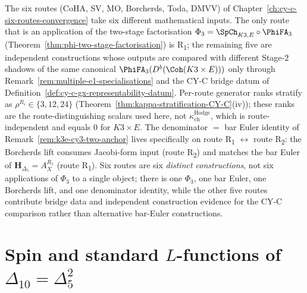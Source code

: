 \begin{remark}
\label{rem:k3e-cy3-six-routes-per-route-kappa}
The six routes (CoHA, SV, MO, Borcherds, Toda, DMVV) of Chapter~\ref{ch:cy-c-six-routes-convergence} take six different mathematical inputs. The only route that is an application of the two-stage factorisation \(\Phi_3=\SpCh_{K3,E}\circ\PhiFA_3\) (Theorem~\ref{thm:phi-two-stage-factorisation}) is R\textsubscript{1}; the remaining five are independent constructions whose outputs are compared with different Stage-\(2\) shadows of the same canonical \(\PhiFA_3(D^b(\Coh(K3\times E)))\) only through Remark~\ref{rem:multiple-e1-specialisations} and the CY-C bridge datum of Definition~\ref{def:cy-c-gx-representability-datum}. Per-route generator ranks stratify as \(\rho^{R_i}\in\{3,12,24\}\) (Theorem~\ref{thm:kappa-stratification-CY-C}(iv)); these ranks are the route-distinguishing scalars used here, not \(\kappa_{\mathrm{ch}}^{\mathrm{Hodge}}\), which is route-independent and equals \(0\) for \(K3\times E\). The denominator \(=\) bar Euler identity of Remark~\ref{rem:k3e-cy3-two-anchor} lives specifically on route R\textsubscript{1} \(\leftrightarrow\) route R\textsubscript{2}: the Borcherds lift consumes Jacobi-form input (route R\textsubscript{2}) and matches the bar Euler of \(\mathbf H_{\Delta_5}=A_X^{R_1}\) (route R\textsubscript{1}). Six routes are six \emph{distinct constructions}, not six applications of \(\Phi_3\) to a single object; there is one \(\Phi_3\), one bar Euler, one Borcherds lift, and one denominator identity, while the other five routes contribute bridge data and independent construction evidence for the CY-C comparison rather than alternative bar-Euler constructions.
\end{remark}

\section{Spin and standard \texorpdfstring{$L$}{L}-functions of \texorpdfstring{$\Delta_{10} = \Delta_5^2$}{Delta-10 = Delta-5-2}}
\label{sec:k3e-cy3-delta10-Lfunctions}

